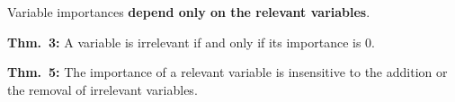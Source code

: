 \documentclass[final]{beamer}
\newcommand{\cmark}{\ding{51}}%
\begin{document}
\begin{frame}

\vspace{-3cm}

{\color{green} \cmark} Variable importances \textbf{depend only on the relevant variables}.

\vspace{1cm}

\textbf{Thm.~3:} A variable is irrelevant if and only if its importance is 0.

\vspace{1cm}

\textbf{Thm.~5:} The importance of a relevant variable is insensitive to the addition or the removal of irrelevant variables.

\end{frame}
\end{document}
